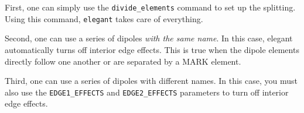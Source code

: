 First, one can simply use the \verb|divide_elements| command to set up
the splitting.  Using this command, {\tt elegant} takes care of everything.

Second, one can use a series of dipoles {\em with the same name}.  In this case,
elegant automatically turns off interior edge effects.  This is true when the
dipole elements directly follow one another or are separated by a MARK element.

Third, one can use a series of dipoles with different names.  In this case, you
must also use the \verb|EDGE1_EFFECTS| and \verb|EDGE2_EFFECTS| parameters to
turn off interior edge effects.  

